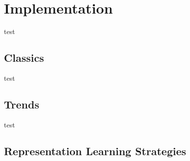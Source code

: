 \chapter{Implementation}
test
\section{Classics}
test
\section{Trends}
test
\section{Representation Learning Strategies}